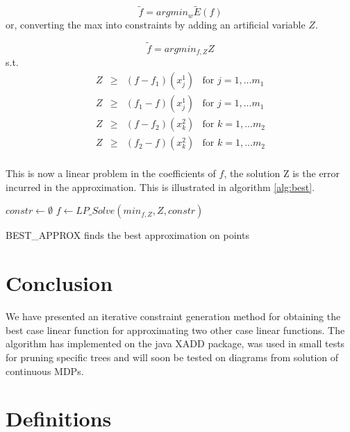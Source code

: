 $$\tilde{f} = argmin_w \tilde{E}(f) $$
or, converting the max into constraints by adding an artificial variable $Z$.

$$\tilde{f} = argmin_{f,Z}  Z $$
s.t. 
$$
	\begin{array}{llll}
		Z & \geq & (f - f_1) (x^1_j) & \mbox{for } j = 1,...m_1\\
		Z & \geq & (f_1 - f) (x^1_j) & \mbox{for } j = 1,...m_1\\
		Z & \geq & (f - f_2) (x^2_k) & \mbox{for } k = 1,...m_2\\
		Z & \geq & (f_2 - f) (x^2_k) & \mbox{for } k = 1,...m_2\\
	\end{array}
$$

This is now a linear problem in the coefficients of $f$, the solution Z is the error incurred in the approximation. This is illustrated in algorithm \ref{alg:best}.

\begin{algorithm}[!h]
\dontprintsemicolon
{}
$constr \gets \emptyset$\;
\;
$f \gets LP\_Solve(min_{f,Z}, Z, constr)$\;	
\;
\caption{{\sc BEST\_APPROX} finds the best approximation on points}
\label{alg:best}
\end{algorithm}

\section{Conclusion}
We have presented an iterative constraint generation method for obtaining the best case linear function for approximating two other case linear functions. The algorithm has implemented on the java XADD package, was used in small tests for pruning specific trees and will soon be tested on diagrams from solution of continuous MDPs. 
\newpage
\appendix
\section{Definitions} 
\label{appA} 

